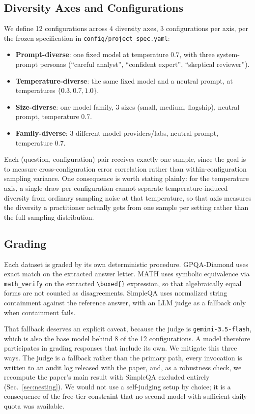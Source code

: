 \documentclass[conference]{IEEEtran}
\begin{document}
\subsection{Diversity Axes and Configurations}
We define 12 configurations across 4 diversity axes, 3 configurations per
axis, per the frozen specification in \texttt{config/project\_spec.yaml}:
\begin{itemize}
\item \textbf{Prompt-diverse}: one fixed model at temperature $0.7$, with
three system-prompt personas (``careful analyst'', ``confident expert'',
``skeptical reviewer'').
\item \textbf{Temperature-diverse}: the same fixed model and a neutral
prompt, at temperatures $\{0.3, 0.7, 1.0\}$.
\item \textbf{Size-diverse}: one model family, 3 sizes (small, medium,
flagship), neutral prompt, temperature $0.7$.
\item \textbf{Family-diverse}: 3 different model providers/labs, neutral
prompt, temperature $0.7$.
\end{itemize}
Each (question, configuration) pair receives exactly one sample, since the
goal is to measure cross-configuration error correlation rather than
within-configuration sampling variance. One consequence is worth stating
plainly: for the temperature axis, a single draw per configuration cannot
separate temperature-induced diversity from ordinary sampling noise at that
temperature, so that axis measures the diversity a practitioner actually
gets from one sample per setting rather than the full sampling distribution.

\subsection{Grading}
\label{sec:grading}
Each dataset is graded by its own deterministic procedure. GPQA-Diamond uses
exact match on the extracted answer letter. MATH uses symbolic equivalence
via \texttt{math\_verify} on the extracted \verb|\boxed{}| expression, so
that algebraically equal forms are not counted as disagreements. SimpleQA
uses normalized string containment against the reference answer, with an
LLM judge as a fallback only when containment fails.

That fallback deserves an explicit caveat, because the judge is
\texttt{gemini-3.5-flash}, which is also the base model behind 8 of the 12
configurations. A model therefore participates in grading responses that
include its own. We mitigate this three ways. The judge is a fallback rather
than the primary path, every invocation is written to an audit log released
with the paper, and, as a robustness check, we recompute the paper's main
result with SimpleQA excluded entirely (Sec.~\ref{sec:nesting}). We would
not use a self-judging setup by choice; it is a consequence of the free-tier
constraint that no second model with sufficient daily quota was available.
\end{document}
